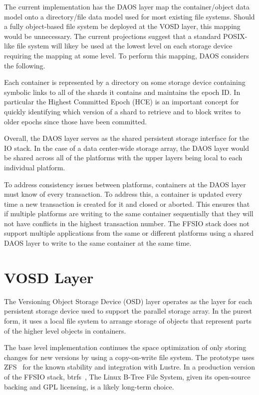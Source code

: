 \documentclass[conference]{IEEEtran}
\begin{document}
The current implementation has the DAOS layer map the container/object data
model onto a directory/file data model used for most existing file systems.
Should a fully object-based file system be deployed at the VOSD layer, this
mapping would be unnecessary. The current projections suggest that a standard
POSIX-like file system will likey be used at the lowest level on each storage
device requiring the mapping at some level. To perform this mapping, DAOS
considers the following.

Each container is represented by a directory on some storage device containing
symbolic links to all of the shards it contains and maintains the epoch ID.
In particular the Highest Committed Epoch (HCE) is an important concept for
quickly identifying which version of a shard to retrieve and to block writes to
older epochs since those have been committed.

Overall, the DAOS layer serves as the shared persistent storage interface for
the IO stack. In the case of a data center-wide storage array, the DAOS layer
would be shared across all of the platforms with the upper layers being local
to each individual platform.

To address consistency issues between platforms, containers at the DAOS layer
must know of every transaction. To address this, a container is updated every
time a new transaction is created for it and closed or aborted. This ensures
that if multiple platforms are writing to the same container sequentially that
they will not have conflicts in the highest transaction number. The FFSIO stack
does not support multiple applications from the same or different platforms
using a shared DAOS layer to write to the same container at the same time.

\section{VOSD Layer}
\label{sec:vosd}

The Versioning Object Storage Device (OSD) layer operates as the layer for each
persistent storage device used to support the parallel storage array. In the
purest form, it uses a local file system to arrange storage of objects that
represent parts of the higher level objects in containers.

The base level implementation continues the space optimization of only storing
changes for new versions by using a copy-on-write file system. The prototype
uses ZFS~\cite{zhang:2010:zfs} for the known stability and integration with
Lustre. In a production version of the FFSIO stack,
btrfs~\cite{rodeh:2013:btrfs}, The Linux B-Tree File System, given its
open-source backing and GPL licensing, is a likely long-term choice.
\end{document}
